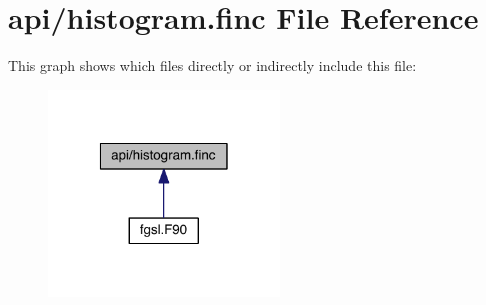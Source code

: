 \hypertarget{histogram_8finc}{\section{api/histogram.finc File Reference}
\label{histogram_8finc}
}
This graph shows which files directly or indirectly include this file\-:\nopagebreak
\begin{figure}[H]
\begin{center}
\leavevmode
\includegraphics[width=174pt]{histogram_8finc__dep__incl}
\end{center}
\end{figure}
